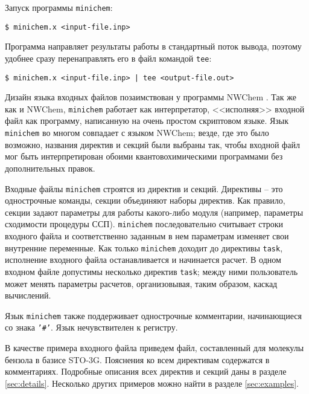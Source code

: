 \documentclass[a4paper, 12pt]{article}
\begin{document}
Запуск программы \texttt{minichem}:
\begin{lstlisting}
$ minichem.x <input-file.inp>
\end{lstlisting}

Программа направляет результаты работы в стандартный поток вывода, поэтому удобнее сразу перенаправлять его в файл командой \texttt{tee}:
\begin{lstlisting}
$ minichem.x <input-file.inp> | tee <output-file.out>
\end{lstlisting}

Дизайн языка входных файлов позаимствован у программы NWChem \cite{nwchem2010}. Так же как и NWChem, \texttt{minichem} работает как интерпретатор, <<исполняя>> входной файл как программу, написанную на очень простом скриптовом языке. Язык \texttt{minichem} во многом совпадает с языком NWChem; везде, где это было возможно, названия директив и секций были выбраны так, чтобы входной файл мог быть интерпретирован обоими квантовохимическими программами без дополнительных правок.

Входные файлы \texttt{minichem} строятся из директив и секций. Директивы -- это однострочные команды, секции объединяют наборы директив. Как правило, секции задают параметры для работы какого-либо модуля (например, параметры сходимости процедуры ССП). \texttt{minichem} последовательно считывает строки входного файла и соответственно заданным в нем параметрам изменяет свои внутренние переменные. Как только \texttt{minichem} доходит до директивы \texttt{task}, исполнение входного файла останавливается и начинается расчет. В одном входном файле допустимы несколько директив \texttt{task}; между ними пользователь может менять параметры расчетов, организовывая, таким образом, каскад вычислений.

Язык \texttt{minichem} также поддерживает однострочные комментарии, начинающиеся со знака \texttt{'\#'}. Язык нечувствителен к регистру.

В качестве примера входного файла приведем файл, составленный для молекулы бензола в базисе STO-3G. Пояснения ко всем директивам содержатся в комментариях.
Подробные описания всех директив и секций даны в разделе \ref{sec:details}. Несколько других примеров можно найти в разделе \ref{sec:examples}.
\end{document}
